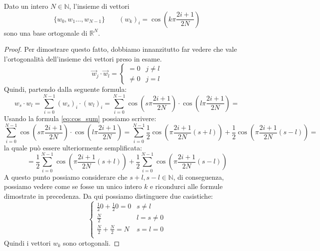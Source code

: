 \begin{proposizione}
    Dato un intero $N\in\mathbb{N}$, l'insieme di vettori
    \begin{equation}
        \{w_0,w_1\dots, w_{N-1}\} \qquad (w_k)_i  = \cos\left( k\pi \frac{2i+1}{2N}\right)
    \end{equation}
    sono una base ortogonale di $\mathbb{R}^N$.
    \begin{proof}
        Per dimostrare questo fatto, dobbiamo innanzitutto far vedere che vale
        l'ortogonalità dell'insieme dei vettori preso in esame.
        \begin{equation*}
            \vec{w}_j \cdot \vec{w}_l = \begin{cases}
                = 0    & j \neq l \\
                \neq 0 & j = l
            \end{cases}
        \end{equation*}
        Quindi, partendo dalla seguente formula:
        \begin{equation*}
            w_s\cdot w_l = \sum_{i= 0}^{N-1} (w_s)_i\cdot (w_l)_i = \sum_{i= 0}^{N-1}
            \cos\left( s \pi \frac{2i+1}{2N}\right)\cdot  \cos \left( l\pi \frac{2i+1}{2N}\right)=
        \end{equation*}
        Usando la formula \ref{eq:cos_sum} possiamo scrivere:
        \begin{equation*}
            \sum_{i= 0} ^{N-1}  \cos\left( s \pi \frac{2i+1}{2N}\right)\cdot  \cos \left( l\pi \frac{2i+1}{2N}\right)=
            \sum_{i= 0} ^{N-1} \frac{1}{2} \cos\left( \pi \frac{2i+1}{2N}(s+l)\right)  + \frac{1}{2}\cos\left( \pi \frac{2i+1}{2N}(s-l)\right) =
        \end{equation*}
        la quale può essere ulteriormente semplificata:
        \begin{equation*}
            =\frac{1}{2}\sum_{i= 0} ^{N-1}  \cos\left( \pi \frac{2i+1}{2N}(s+l)\right)  + \frac{1}{2}\sum_{i= 0} ^{N-1}\cos\left( \pi \frac{2i+1}{2N}(s-l)\right)
        \end{equation*}
        A questo punto possiamo considerare che $s+l, s-l\in \mathbb{N}$, di
        conseguenza, possiamo vedere come se fosse un unico intero $k$ e ricondurci
        alle formule dimostrate in precedenza. Da qui possiamo distinguere due
        casistiche:
        \begin{equation*}
            \begin{cases}
                \frac{1}{2} 0  + \frac{1}{2} 0 = 0 & s\ne l       \\
                \frac{N}{2}                        & l = s  \ne 0 \\
                \frac{N}{2} + \frac{N}{2} = N      & s=l =0       \\
            \end{cases}
        \end{equation*}
        Quindi i vettori $w_k$ sono ortogonali.
    \end{proof}
\end{proposizione}

